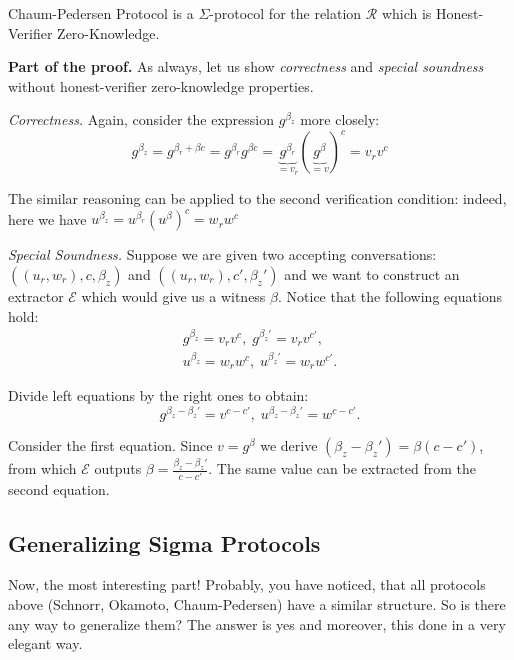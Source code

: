 \documentclass[../lecture-notes-148x210.tex]{subfiles}
\begin{document}
\begin{theorem}
    Chaum-Pedersen Protocol is a $\Sigma$-protocol for the relation $\mathcal{R}$ which is Honest-Verifier Zero-Knowledge.
\end{theorem}

\textbf{Part of the proof.} As always, let us show \textit{correctness} and \textit{special soundness} without honest-verifier zero-knowledge properties.

\textit{Correctness.} Again, consider the expression $g^{\beta_z}$ more closely:
\begin{equation*}
    g^{\beta_z} = g^{\beta_r + \beta c} = g^{\beta_r}g^{\beta c} = \underbrace{g^{\beta_r}}_{=v_r}(\underbrace{g^{\beta}}_{=v})^c = v_rv^c
\end{equation*}

The similar reasoning can be applied to the second verification condition: indeed, here we have $u^{\beta_z} = u^{\beta_r}(u^{\beta})^c = w_rw^c$

\textit{Special Soundness.} Suppose we are given two accepting conversations: $((u_r,w_r),c,\beta_z)$ and $((u_r,w_r),c',\beta_z')$ and we want to construct an extractor $\mathcal{E}$ which would give us a witness $\beta$. Notice that the following equations hold:
\begin{align*}
    g^{\beta_z} = v_rv^c, \; g^{\beta_z'} = v_rv^{c'}, \\ u^{\beta_z} = w_rw^c, \; u^{\beta_z'} = w_rw^{c'}.
\end{align*}

Divide left equations by the right ones to obtain:
\begin{equation*}
    g^{\beta_z - \beta_z'} = v^{c-c'}, \; u^{\beta_z - \beta_z'} = w^{c-c'}.
\end{equation*}

Consider the first equation. Since $v=g^{\beta}$ we derive $(\beta_z-\beta_z') = \beta(c-c')$, from which $\mathcal{E}$ outputs $\beta = \frac{\beta_z-\beta_z'}{c-c'}$. The same value can be extracted from the second equation.

\subsection{Generalizing Sigma Protocols}

Now, the most interesting part! Probably, you have noticed, that all protocols above (Schnorr, Okamoto, Chaum-Pedersen) have a similar structure. So is there any way to generalize them? The answer is yes and moreover, this done in a very elegant way.
\end{document}
